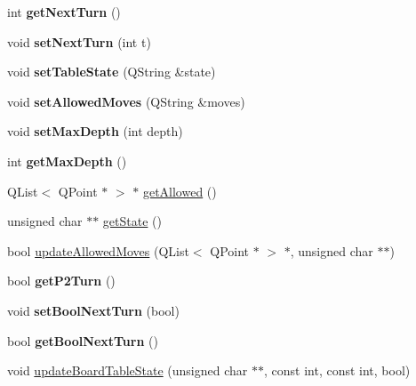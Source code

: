 \begin{DoxyCompactItemize}
\item 
\hypertarget{classOthello_aea9a935c97157a4266afce2075557e98}{
int {\bfseries getNextTurn} ()}
\label{classOthello_aea9a935c97157a4266afce2075557e98}

\item 
\hypertarget{classOthello_abb31e78fb494eecfb45a7341a67372cc}{
void {\bfseries setNextTurn} (int t)}
\label{classOthello_abb31e78fb494eecfb45a7341a67372cc}

\item 
\hypertarget{classOthello_a4664ebdb1bb2f088804326a05a072ad3}{
void {\bfseries setTableState} (QString \&state)}
\label{classOthello_a4664ebdb1bb2f088804326a05a072ad3}

\item 
\hypertarget{classOthello_ac61e94f44f20a371de28d22897d87e7a}{
void {\bfseries setAllowedMoves} (QString \&moves)}
\label{classOthello_ac61e94f44f20a371de28d22897d87e7a}

\item 
\hypertarget{classOthello_ad3f3fcbb1b0536e1cf70ffd817444f0b}{
void {\bfseries setMaxDepth} (int depth)}
\label{classOthello_ad3f3fcbb1b0536e1cf70ffd817444f0b}

\item 
\hypertarget{classOthello_abd24207cf221ce7928042f7657de41d3}{
int {\bfseries getMaxDepth} ()}
\label{classOthello_abd24207cf221ce7928042f7657de41d3}

\item 
QList$<$ QPoint $\ast$ $>$ $\ast$ \hyperlink{classOthello_a04ed8a5292e35c7f1d270043fd2f6b23}{getAllowed} ()
\item 
unsigned char $\ast$$\ast$ \hyperlink{classOthello_aca9c2604072c6f0b49397a1e755237c6}{getState} ()
\item 
bool \hyperlink{classOthello_a218e0649bae4dd80ed1619d01fc34e47}{updateAllowedMoves} (QList$<$ QPoint $\ast$ $>$ $\ast$, unsigned char $\ast$$\ast$)
\item 
\hypertarget{classOthello_a70c8232810f591fd5be1fefb0865d6a4}{
bool {\bfseries getP2Turn} ()}
\label{classOthello_a70c8232810f591fd5be1fefb0865d6a4}

\item 
\hypertarget{classOthello_ac925385eb8937d57a031613c32ca15a2}{
void {\bfseries setBoolNextTurn} (bool)}
\label{classOthello_ac925385eb8937d57a031613c32ca15a2}

\item 
\hypertarget{classOthello_ae18e2b408adacd42b292d809e07465aa}{
bool {\bfseries getBoolNextTurn} ()}
\label{classOthello_ae18e2b408adacd42b292d809e07465aa}

\item 
void \hyperlink{classOthello_aaabaaf21954db125526e190f9121987d}{updateBoardTableState} (unsigned char $\ast$$\ast$, const int, const int, bool)
\end{DoxyCompactItemize}


